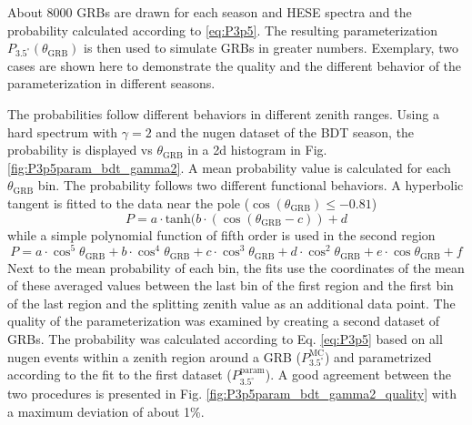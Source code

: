 About 8000 GRBs are drawn for each season and HESE spectra
and the probability calculated according to \ref{eq:P3p5}. The resulting 
parameterization 
$P_{3.5^\circ}(\theta_\text{GRB})$ is then used to simulate GRBs in greater 
numbers.
Exemplary, two cases are shown here to demonstrate the quality and the 
different behavior of the parameterization in different seasons.

The probabilities follow different behaviors in different zenith ranges. Using 
a 
hard spectrum with $\gamma=2$ and the nugen dataset of the BDT season, the 
probability is displayed  vs
$\theta_\text{GRB}$ in a 2d histogram in Fig. \ref{fig:P3p5param_bdt_gamma2}. A 
mean probability value is calculated for each $\theta_\text{GRB}$ bin.
The probability follows two different functional behaviors. A hyperbolic 
tangent is fitted to the data near the pole ($\cos(\theta_\text{GRB}) 
\leq -0.81$)
\begin{equation}
\label{eq:Ptanh}
 P = a \cdot \text{tanh}(b \cdot (\cos(\theta_\text{GRB}- c)) + d
\end{equation}
while a simple polynomial function of fifth order is used in the second region
\begin{equation}
\label{eq:PPoly}
 P = a \cdot \cos^5\theta_\text{GRB} + b \cdot 
\cos^4\theta_\text{GRB} + c \cdot \cos^3\theta_\text{GRB} + d 
\cdot \cos^2\theta_\text{GRB} + e \cdot \cos\theta_\text{GRB} + f
\end{equation}
Next to the mean probability of each bin, the fits use the coordinates of 
the mean of these averaged values between the 
last bin of the first region and the first bin of the last region and the 
splitting zenith value as an additional data point.
The quality of the parameterization was examined by creating a second dataset 
of GRBs. The probability was calculated according to Eq. 
\ref{eq:P3p5} based on all 
nugen events within a zenith region around a GRB ($P_{3.5^\circ}^\text{MC}$) 
and parametrized according to the fit to the first 
dataset ($P_{3.5^\circ}^\text{param}$).
A good agreement between the two procedures is presented in Fig. 
\ref{fig:P3p5param_bdt_gamma2_quality} with a maximum deviation of about 1\%.

